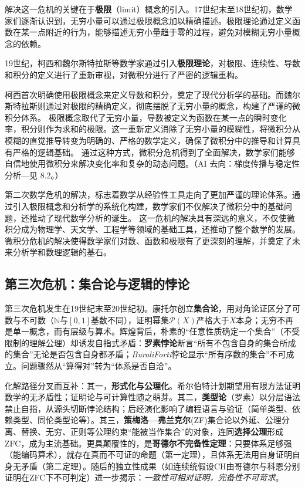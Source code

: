 解决这一危机的关键在于{\bf 极限}（limit）概念的引入。17世纪末至18世纪初，数学家们逐渐认识到，无穷小量可以通过极限概念加以精确描述。极限理论通过定义函数在某一点附近的行为，能够描述无穷小量趋于零的过程，避免对模糊无穷小量概念的依赖。

19世纪，柯西和魏尔斯特拉斯等数学家通过引入{\bf 极限理论}，对极限、连续性、导数和积分的定义进行了重新审视，对微积分进行了严密的逻辑重构。

柯西首次明确使用极限概念来定义导数和积分，奠定了现代分析学的基础。而魏尔斯特拉斯则通过对极限的精确定义，彻底摆脱了无穷小量的概念，构建了严谨的微积分体系。
极限概念取代了无穷小量，导数被定义为函数在某一点的瞬时变化率，积分则作为求和的极限。这一重新定义消除了无穷小量的模糊性，将微积分从模糊的直觉推导转变为明确的、严格的数学定义，确保了微积分中的推导和计算具有严格的逻辑基础。
通过这种方式，微积分危机得到了全面解决，数学家们能够自信地使用微积分来解决变化率和复杂的动态问题。{（AI 去向：梯度传播与稳定性分析—见 8.2。）}

第二次数学危机的解决，标志着数学从经验性工具走向了更加严谨的理论体系。通过引入极限概念和分析学的系统化构建，数学家们不仅解决了微积分中的基础问题，还推动了现代数学分析的诞生。
这一危机的解决具有深远的意义，不仅使微积分成为物理学、天文学、工程学等领域的基础工具，还推动了整个数学的发展。微积分危机的解决使得数学家们对数、函数和极限有了更深刻的理解，并奠定了未来分析学和数理逻辑的基石。

\subsection{第三次危机：集合论与逻辑的悖论}

第三次危机发生在19世纪末至20世纪初。康托尔创立{\bf 集合论}，用对角论证区分了可数与不可数（$\mathbb{N}$与$[0,1]$基数不同），证明幂集$\mathcal{P}(X)$严格大于$X$本身；无穷不再是单一概念，而有层级与算术。辉煌背后，朴素的“任意性质确定一个集合”（不受限制的理解公理）却诱发自指式矛盾：{\bf 罗素悖论}断言“所有不包含自身的集合所成的集合”无论是否包含自身都矛盾；{\itshape Burali\textendash Forti}悖论显示“所有序数的集合”不可成立。问题骤然从“算得对”转为“体系是否自洽”。

化解路径分叉而互补：其一，{\bf 形式化与公理化}。希尔伯特计划期望用有限方法证明数学的无矛盾性；证明论与可计算性随之萌芽。其二，{\bf 类型论}（罗素）以分层语法禁止自指，从源头切断悖论结构；后经演化影响了编程语言与验证（简单类型、依赖类型、同伦类型论等）。其三，{\bf 策梅洛—弗兰克尔}(ZF)集合论以外延、公理分离、替换、无穷、正则等公理约束“能被当作集合”的对象，连同{\bf 选择公理}形成ZFC，成为主流基础。更具颠覆性的，是{\bf 哥德尔不完备性定理}：只要体系足够强（能编码算术），就存在真而不可证的命题（第一定理），且体系无法用自身证明自身无矛盾（第二定理）。随后的独立性成果（如连续统假设CH由哥德尔与科恩分别证明在ZFC下不可判定）进一步揭示：{\itshape 一致性可相对证明，完备性不可苛求}。


